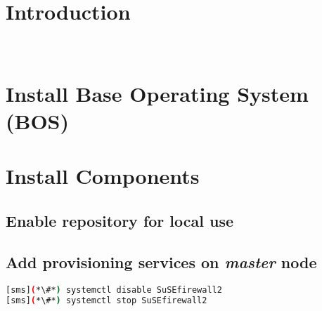 \documentclass[letterpaper]{article}
\begin{document}
\graphicspath{{common/figures/}}
\thispagestyle{empty}


 

\newpage
\tableofcontents
\newpage


\section{Introduction} \label{sec:introduction}

 \\







\section{Install Base Operating System (BOS)}



\section{Install \OHPC{} Components} \label{sec:basic_install}


\subsection{Enable \OHPC{} repository for local use} \label{sec:enable_repo}




\subsection{Add provisioning services on {\em master} node} \label{sec:add_provisioning}



\begin{lstlisting}[language=bash,keywords={}]
[sms](*\#*) systemctl disable SuSEfirewall2
[sms](*\#*) systemctl stop SuSEfirewall2
\end{lstlisting}
\end{document}
